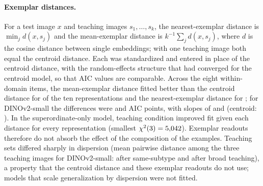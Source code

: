 \paragraph{Exemplar distances.} For a test image $x$ and teaching images $s_1, \dots, s_k$, the nearest-exemplar distance is $\min_j d(x, s_j)$ and the mean-exemplar distance is $k^{-1}\sum_j d(x, s_j)$, where $d$ is the cosine distance between single embeddings; with one teaching image both equal the centroid distance. Each was standardized and entered in place of the centroid distance, with the random-effects structure that had converged for the centroid model, so that AIC values are comparable. Across the eight within-domain items, the mean-exemplar distance fitted better than the centroid distance for \VcDmeanBetterN{} of the ten representations and the nearest-exemplar distance for \VcDminBetterN; for DINOv2-small the differences were \VcPcDmeandAIC{} and \VcPcDmindAIC{} AIC points, with slopes of \VcPcDmeanB{} and \VcPcDminB{} (centroid: \VtPcRefB). In the superordinate-only model, teaching condition improved fit given each distance for every representation (smallest $\chi^2(3) = 5{,}042$). Exemplar readouts therefore do not absorb the effect of the composition of the examples. Teaching sets differed sharply in dispersion (mean pairwise distance among the three teaching images for DINOv2-small: \VcDispSub{} after same-subtype and \VcDispSup{} after broad teaching), a property that the centroid distance and these exemplar readouts do not use; models that scale generalization by dispersion were not fitted.

\begin{table}[!htbp]
\centering
\caption{Post Hoc Adult Models (Exploratory)}
\label{tab:posthoc}
\small
\setlength{\tabcolsep}{3pt}
\noindent{}
\par{}
\end{table}

